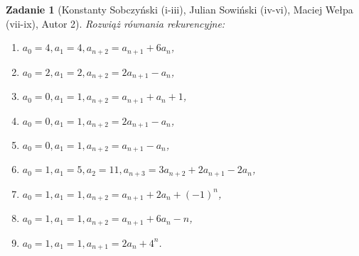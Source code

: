 \documentclass{mwart}
\newtheorem{zad}{Zadanie}[section]
\begin{document}
\begin{zad}[Konstanty Sobczyński (i-iii), Julian Sowiński (iv-vi), Maciej Wełpa (vii-ix), Autor 2]
    Rozwiąż równania rekurencyjne:
    \begin{enumerate}
        \item $a_0=4, a_1=4, a_{n+2}=a_{n+1}+6a_n$,
        \item $a_0=2, a_1=2, a_{n+2}=2a_{n+1}-a_n$,
        \item $a_0=0, a_1=1, a_{n+2}=a_{n+1}+a_n+1$,
        \item $a_0=0, a_1=1, a_{n+2}=2a_{n+1}-a_n$,
        \item $a_0=0, a_1=1, a_{n+2}=a_{n+1}-a_n$,
        \item $a_0=1, a_1=5, a_2=11, a_{n+3}=3a_{n+2}+2a_{n+1}-2a_n$,
        \item $a_0=1, a_1=1, a_{n+2}=a_{n+1}+2a_n+(-1)^n$,
        \item $a_0=1, a_1=1, a_{n+2}=a_{n+1}+6a_n-n$,
        \item $a_0=1, a_1=1, a_{n+1}=2a_n+4^n$.
    \end{enumerate}
\end{zad}
\end{document}
